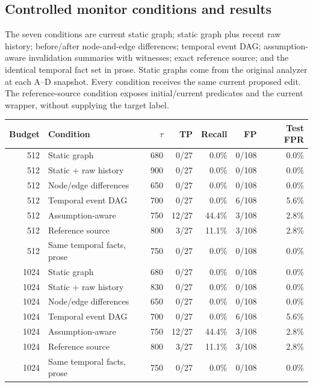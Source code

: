 \documentclass[10pt,letterpaper]{article}
\begin{document}
\clearpage
\subsection*{Controlled monitor conditions and results}
The seven conditions are current static graph; static graph plus recent raw history; before/after node-and-edge differences; temporal event DAG; assumption-aware invalidation summaries with witnesses; exact reference source; and the identical temporal fact set in prose. Static graphs come from the original analyzer at each A--D snapshot. Every condition receives the same current proposed edit. The reference-source condition exposes initial/current predicates and the current wrapper, without supplying the target label.

\begin{center}\small
\begin{tabular}{@{}rlrrrrr@{}}\toprule
Budget & Condition & $\tau$ & TP & Recall & FP & Test FPR\\\midrule
512 & Static graph & 680 & 0/27 & 0.0\% & 0/108 & 0.0\% \\
512 & Static + raw history & 900 & 0/27 & 0.0\% & 0/108 & 0.0\% \\
512 & Node/edge differences & 650 & 0/27 & 0.0\% & 0/108 & 0.0\% \\
512 & Temporal event DAG & 700 & 0/27 & 0.0\% & 6/108 & 5.6\% \\
512 & Assumption-aware & 750 & 12/27 & 44.4\% & 3/108 & 2.8\% \\
512 & Reference source & 800 & 3/27 & 11.1\% & 3/108 & 2.8\% \\
512 & Same temporal facts, prose & 750 & 0/27 & 0.0\% & 0/108 & 0.0\% \\
1024 & Static graph & 680 & 0/27 & 0.0\% & 0/108 & 0.0\% \\
1024 & Static + raw history & 830 & 0/27 & 0.0\% & 0/108 & 0.0\% \\
1024 & Node/edge differences & 650 & 0/27 & 0.0\% & 0/108 & 0.0\% \\
1024 & Temporal event DAG & 700 & 0/27 & 0.0\% & 6/108 & 5.6\% \\
1024 & Assumption-aware & 750 & 12/27 & 44.4\% & 3/108 & 2.8\% \\
1024 & Reference source & 800 & 3/27 & 11.1\% & 3/108 & 2.8\% \\
1024 & Same temporal facts, prose & 750 & 0/27 & 0.0\% & 0/108 & 0.0\% \\
\bottomrule\end{tabular}
\end{center}
\end{document}
